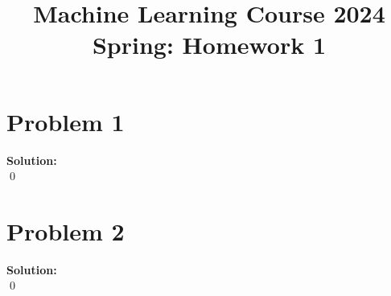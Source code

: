 \documentclass[12pt, a4paper,oneside, UTF8]{article}
\title{Machine Learning Course 2024 Spring: Homework 1}
\newenvironment{solution}{\textbf{Solution:}\\}{\qed\par}
\begin{document}
\maketitle

\section{Problem 1}
\begin{solution}
    
\end{solution}

\section{Problem 2}
\begin{solution}
    
\end{solution}
\end{document}
